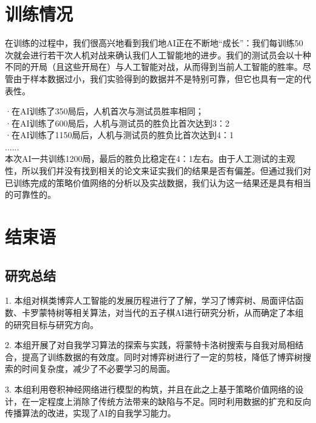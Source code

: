 \documentclass[a4paper]{article}
\begin{document}
\begin{multicols}{2}
  \section{训练情况}
  在训练的过程中，我们很高兴地看到我们地AI正在不断地“成长”：我们每训练50次就会进行若干次人机对战来确认我们人工智能地的进步。我们的测试员会以十种不同的开局（且这些开局在）与人工智能对战，从而得到当前人工智能的胜率。尽管由于样本数据过小，我们实验得到的数据并不是特别可靠，但它也具有一定的代表性。\par
·在AI训练了350局后，人机首次与测试员胜率相同；\\
·在AI训练了600局后，人机与测试员的胜负比首次达到3：2\\
·在AI训练了1150局后，人机与测试员的胜负比首次达到4：1\\
......\\
本次AI一共训练1200局，最后的胜负比稳定在4：1左右。由于人工测试的主观性，所以我们并没有找到相关的论文来证实我们的结果是否有偏差。但通过我们对已训练完成的策略价值网络的分析以及实战数据，我们认为这一结果还是具有相当的可靠性的。\par
  \section{结束语}
  \subsection{研究总结}
  1.	本组对棋类博弈人工智能的发展历程进行了了解，学习了博弈树、局面评估函数、卡罗蒙特树等相关算法，对当代的五子棋AI进行研究分析，从而确定了本组的研究目标与研究方向。\par
2.	本组开展了对自我学习算法的探索与实践，将蒙特卡洛树搜索与自我对局相结合，提高了训练数据的有效度。同时对博弈树进行了一定的剪枝，降低了博弈树搜索的时间复杂度，减少了不必要学习的局面。\par
3.	本组利用卷积神经网络进行模型的构筑，并且在此之上基于策略价值网络的设计，在一定程度上消除了传统方法带来的缺陷与不足。同时利用数据的扩充和反向传播算法的改进，实现了AI的自我学习能力。\par

\end{multicols}
\end{document}
